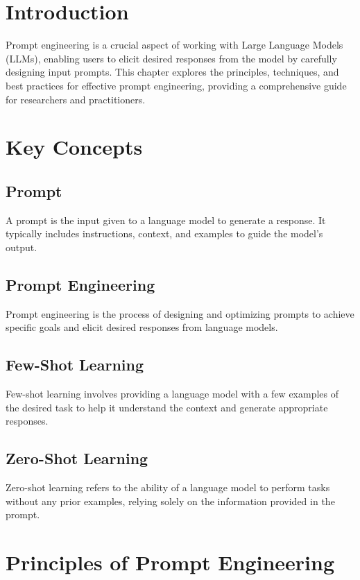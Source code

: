 \section{Introduction}
Prompt engineering is a crucial aspect of working with Large Language Models (LLMs), enabling users to elicit desired responses from the model by carefully designing input prompts. This chapter explores the principles, techniques, and best practices for effective prompt engineering, providing a comprehensive guide for researchers and practitioners.

\section{Key Concepts}

\subsection{Prompt}
A prompt is the input given to a language model to generate a response. It typically includes instructions, context, and examples to guide the model's output.

\subsection{Prompt Engineering}
Prompt engineering is the process of designing and optimizing prompts to achieve specific goals and elicit desired responses from language models.

\subsection{Few-Shot Learning}
Few-shot learning involves providing a language model with a few examples of the desired task to help it understand the context and generate appropriate responses.

\subsection{Zero-Shot Learning}
Zero-shot learning refers to the ability of a language model to perform tasks without any prior examples, relying solely on the information provided in the prompt.

\section{Principles of Prompt Engineering}

